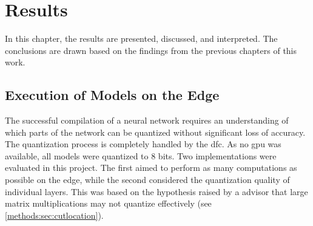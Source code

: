 




\chapter{Results}  
In this chapter, the results are presented, discussed, and interpreted.  
The conclusions are drawn based on the findings from the previous chapters of this work.  

\section{Execution of Models on the Edge}  
The successful compilation of a neural network requires an understanding of which parts of the network can be quantized without significant loss of accuracy.
The quantization process is completely handled by the \acrshort{dfc}.
As no \acrshort{gpu} was available, all models were quantized to 8 bits. 
Two implementations were evaluated in this project.  
The first aimed to perform as many computations as possible on the edge, while the second considered the quantization quality of individual layers.  
This was based on the hypothesis raised by a advisor that large matrix multiplications may not quantize effectively (see \cref{methods:sec:cutlocation}).
  

